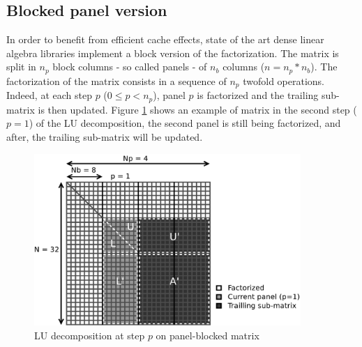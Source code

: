 \subsection*{Blocked panel version}

In order to benefit from efficient cache effects, state of the art dense linear algebra libraries implement a block version of the factorization. The matrix is split in $n_p$ block columns - so called panels - of $n_b$ columns ($n = n_p * n_b$). The factorization of the matrix consists in a sequence of $n_p$ twofold operations. Indeed, at each step $p$ ($0 \leq p < n_p$), panel $p$ is factorized and the trailing sub-matrix is then updated. Figure \ref{fig:matrix} shows an example of matrix in the second step ($p=1$) of the LU decomposition, the second panel is still being factorized, and after, the trailing sub-matrix will be updated.

\begin{figure}[!ht]
\centering
\includegraphics[width=0.9\textwidth]{figures/panel_matrix_bw.pdf}
\caption{LU decomposition at step $p$ on panel-blocked matrix \label{fig:matrix}}
\end{figure}

